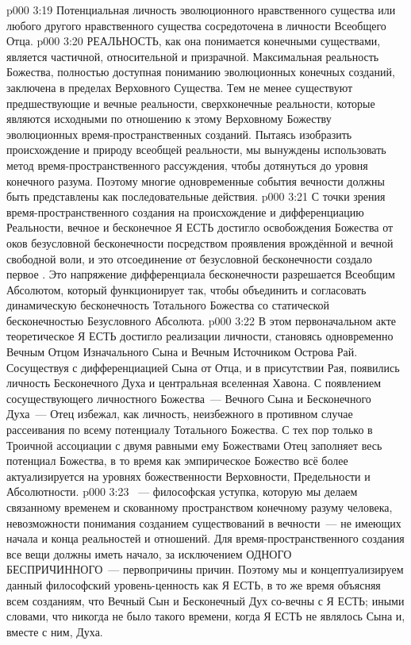 \vs p000 3:19 Потенциальная личность эволюционного нравственного существа или любого другого нравственного существа сосредоточена в личности Всеобщего Отца.
\vs p000 3:20 \pc РЕАЛЬНОСТЬ, как она понимается конечными существами, является частичной, относительной и призрачной. Максимальная реальность Божества, полностью доступная пониманию эволюционных конечных созданий, заключена в пределах Верховного Существа. Тем не менее существуют предшествующие и вечные реальности, сверхконечные реальности, которые являются исходными по отношению к этому Верховному Божеству эволюционных время\hyp{}пространственных созданий. Пытаясь изобразить происхождение и природу всеобщей реальности, мы вынуждены использовать метод время\hyp{}пространственного рассуждения, чтобы дотянуться до уровня конечного разума. Поэтому многие одновременные события вечности должны быть представлены как последовательные действия.
\vs p000 3:21 С точки зрения время\hyp{}пространственного создания на происхождение и дифференциацию Реальности, вечное и бесконечное Я ЕСТЬ достигло освобождения Божества от оков безусловной бесконечности посредством проявления врождённой и вечной свободной воли, и это отсоединение от безусловной бесконечности создало первое . Это напряжение дифференциала бесконечности разрешается Всеобщим Абсолютом, который функционирует так, чтобы объединить и согласовать динамическую бесконечность Тотального Божества со статической бесконечностью Безусловного Абсолюта.
\vs p000 3:22 В этом первоначальном акте теоретическое Я ЕСТЬ достигло реализации личности, становясь одновременно Вечным Отцом Изначального Сына и Вечным Источником Острова Рай. Сосуществуя с дифференциацией Сына от Отца, и в присутствии Рая, появились личность Бесконечного Духа и центральная вселенная Хавона. С появлением сосуществующего личностного Божества~--- Вечного Сына и Бесконечного Духа~--- Отец избежал, как личность, неизбежного в противном случае рассеивания по всему потенциалу Тотального Божества. С тех пор только в Троичной ассоциации с двумя равными ему Божествами Отец заполняет весь потенциал Божества, в то время как эмпирическое Божество всё более актуализируется на уровнях божественности Верховности, Предельности и Абсолютности.
\vs p000 3:23 \pc {}~--- философская уступка, которую мы делаем связанному временем и скованному пространством конечному разуму человека, невозможности понимания созданием существований в вечности~--- не имеющих начала и конца реальностей и отношений. Для время\hyp{}пространственного создания все вещи должны иметь начало, за исключением ОДНОГО БЕСПРИЧИННОГО~--- первопричины причин. Поэтому мы и концептуализируем данный философский уровень\hyp{}ценность как Я ЕСТЬ, в то же время объясняя всем созданиям, что Вечный Сын и Бесконечный Дух со\hyp{}вечны с Я ЕСТЬ; иными словами, что никогда не было такого времени, когда Я ЕСТЬ не являлось  Сына и, вместе с ним, Духа.
